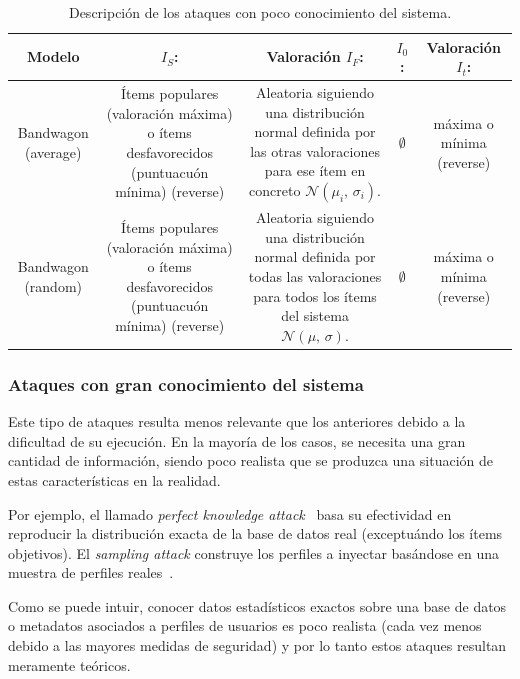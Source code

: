 \begin{table}\centering
		\begin{tabular}{c c c c c}\toprule
			
			Modelo & \textbf{$I_S$:} & Valoración \textbf{$I_F$:} & \textbf{$I_0$:} & Valoración \textbf{$I_t$:} \\ \midrule
			
			\parbox{5em}{Bandwagon (average)} & \parbox{10em} {Ítems populares (valoración máxima) o ítems desfavorecidos (puntuacuón mínima) (reverse)} & \parbox{10em}{Aleatoria siguiendo una distribución normal definida por las otras valoraciones para ese ítem en concreto $\mathcal{N}(\mu_i,\,\sigma_i)$.} & $\emptyset$ & \parbox{5em}{máxima o mínima (reverse)} \\
			
			\parbox{5em}{Bandwagon (random)} & \parbox{10em}{Ítems populares (valoración máxima) o ítems desfavorecidos (puntuacuón mínima) (reverse)} & \parbox{10em}{Aleatoria siguiendo una distribución normal definida por todas las valoraciones para todos los ítems del sistema $\mathcal{N}(\mu,\,\sigma)$.} & $\emptyset$ & \parbox{5em}{máxima o mínima (reverse)} \\
			\bottomrule
		\end{tabular}
	
	\caption{Descripción de los ataques con poco conocimiento del sistema.}
	\label{tabla_descripcion_ataques_poco_con}
\end{table}


\subsubsection{Ataques con gran conocimiento del sistema}

Este tipo de ataques resulta menos relevante que los anteriores debido a la dificultad de su ejecución. En la mayoría de los casos, se necesita una gran cantidad de información, siendo poco realista que se produzca una situación de estas características en la realidad.

Por ejemplo, el llamado \textit{perfect knowledge attack}~\cite{Mobasher2006Thesis} basa su efectividad en reproducir la distribución exacta de la base de datos real (exceptuándo los ítems objetivos). El \textit{sampling attack} construye los perfiles a inyectar basándose en una muestra de perfiles reales~\cite{mingdan2018ShillingAttacksAReview}.

Como se puede intuir, conocer datos estadísticos exactos sobre una base de datos o metadatos asociados a perfiles de usuarios es poco realista (cada vez menos debido a las mayores medidas de seguridad) y por lo tanto estos ataques resultan meramente teóricos.

